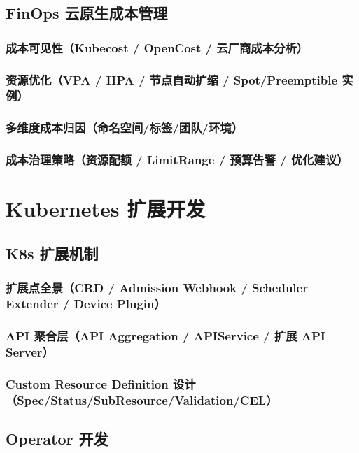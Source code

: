 \documentclass[12pt,UTF8]{ctexbook}
\begin{document}
  \section{FinOps 云原生成本管理}
    \subsection{成本可见性（Kubecost / OpenCost / 云厂商成本分析）}
    \subsection{资源优化（VPA / HPA / 节点自动扩缩 / Spot/Preemptible 实例）}
    \subsection{多维度成本归因（命名空间/标签/团队/环境）}
    \subsection{成本治理策略（资源配额 / LimitRange / 预算告警 / 优化建议）}


\chapter{Kubernetes 扩展开发}
\label{chap:k8s-extension-dev}

  \section{K8s 扩展机制}
    \subsection{扩展点全景（CRD / Admission Webhook / Scheduler Extender / Device Plugin）}
    \subsection{API 聚合层（API Aggregation / APIService / 扩展 API Server）}
    \subsection{Custom Resource Definition 设计（Spec/Status/SubResource/Validation/CEL）}

  \section{Operator 开发}
\end{document}
